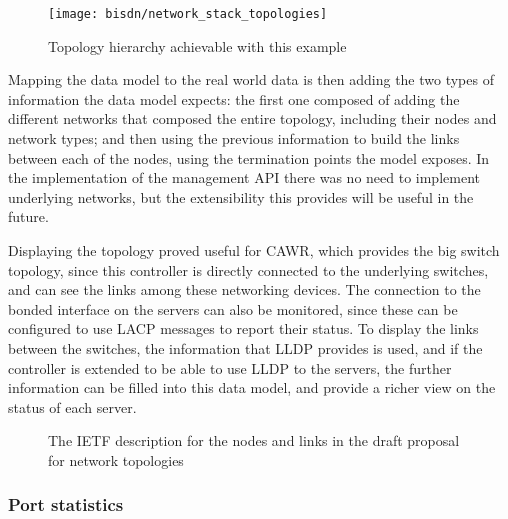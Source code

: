 \begin{figure} [!htbp]
    \centering
    \texttt{[image: bisdn/network\_stack\_topologies]}
    \caption{Topology hierarchy achievable with this example \cite {CITE - https://www.ietf.org/id/draft-ietf-i2rs-yang-network-topo-20.txt}}
\end{figure}

\par Mapping the data model to the real world data is then adding the two types of information the data model expects: the first one composed of adding the different networks that composed the entire topology, including their
nodes and network types; and then using the previous information to build the links between each of the nodes, using the termination points the model exposes. In the implementation of the management API there was no need to implement 
underlying networks, but the extensibility this provides will be useful in the future.
\par Displaying the topology proved useful for CAWR, which provides the big switch topology, since this controller is directly connected to the underlying switches, and can see the links among these networking devices. The connection
to the bonded interface on the servers can also be monitored, since these can be configured to use LACP messages to report their status. To display the links between the switches, the information that LLDP provides is used, 
and if the controller is extended to be able to use LLDP to the servers, the further information can be filled into this data model, and provide a richer view on the status of each server.

\begin{figure} [h]
    \begin{subfigure}
    \texttt{[image: bisdn/ietf\_link]}
    \end{subfigure}
    \begin{subfigure}
    \texttt{[image: bisdn/ietf\_node]}
    \end{subfigure}
\caption{The IETF description for the nodes and links in the draft proposal for network topologies \cite {CITE - https://www.ietf.org/id/draft-ietf-i2rs-yang-network-topo-20.txt} }
\end{figure}

\subsubsection {Port statistics}

